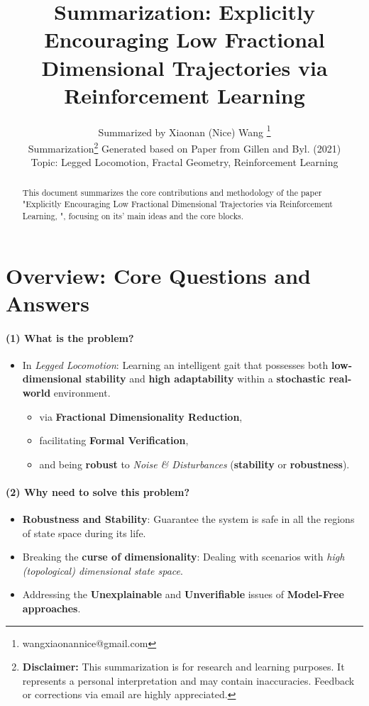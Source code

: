 \documentclass{article}
\title{Summarization: Explicitly Encouraging Low Fractional Dimensional Trajectories via Reinforcement Learning}
\author{
  Summarized by Xiaonan (Nice) Wang \thanks{wangxiaonannice@gmail.com} \\
  Summarization\thanks{\textbf{Disclaimer:} This summarization is for research and learning purposes. It represents a personal interpretation and may contain inaccuracies. Feedback or corrections via email are highly appreciated.} Generated based on Paper from Gillen and Byl. (2021) \\
  Topic: Legged Locomotion, Fractal Geometry, Reinforcement Learning \\
}
\begin{document}
\newcommand{\repeatfootnote}[1]{\textsuperscript{\ref{#1}}}

\maketitle

\begin{abstract}
This document summarizes the core contributions and methodology of the paper "Explicitly Encouraging Low Fractional Dimensional Trajectories via Reinforcement Learning, \cite{gillen2021explicitly}", focusing on its' main ideas and the core blocks.
\end{abstract}

\section{Overview: Core Questions and Answers}
                           
\paragraph{(1) What is the problem?} 
\begin{itemize}
  \item In \textit{Legged Locomotion}: Learning an intelligent gait that possesses both \textbf{low-dimensional stability} and \textbf{high adaptability} within a \textbf{stochastic real-world} environment.
  \begin{itemize}
    \item via \textbf{Fractional Dimensionality Reduction},
    \item facilitating \textbf{Formal Verification},
    \item and being \textbf{robust} to \textit{Noise \& Disturbances} (\textbf{stability} or \textbf{robustness}).
  \end{itemize}
\end{itemize}

\paragraph{(2) Why need to solve this problem?}
\begin{itemize}
  \item \textbf{Robustness and Stability}: Guarantee the system is safe in all the regions of state space during its life.
  \item Breaking the \textbf{curse of dimensionality}: Dealing with scenarios with \textit{high (topological) dimensional state space}.
  \item Addressing the \textbf{Unexplainable} and \textbf{Unverifiable} issues of \textbf{Model-Free approaches}.
\end{itemize}
\end{document}
